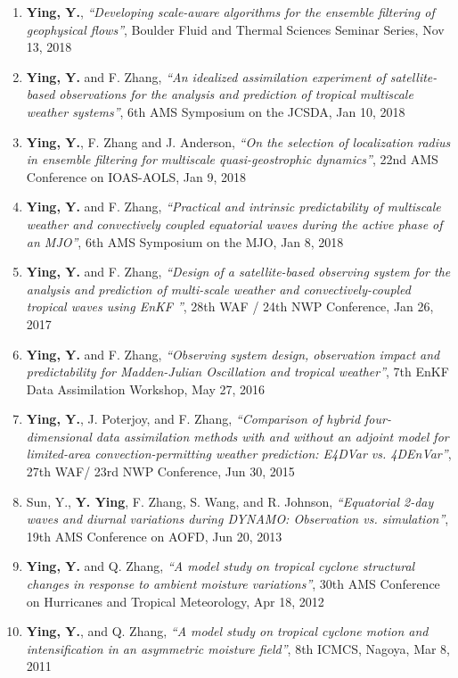 \begin{enumerate}
\item \textbf{Ying, Y.}, \textit{``Developing scale-aware algorithms for the ensemble filtering of geophysical flows''}, Boulder Fluid and Thermal Sciences Seminar Series, Nov 13, 2018

\item \textbf{Ying, Y.} and F. Zhang, \textit{``An idealized assimilation experiment of satellite-based observations for the analysis and prediction of tropical multiscale weather systems''}, 6th AMS Symposium on the JCSDA, Jan 10, 2018

\item \textbf{Ying, Y.}, F. Zhang and J. Anderson, \textit{``On the selection of localization radius in ensemble filtering for multiscale quasi-geostrophic dynamics''}, 22nd AMS Conference on IOAS-AOLS, Jan 9, 2018

\item \textbf{Ying, Y.} and F. Zhang, \textit{``Practical and intrinsic predictability of multiscale weather and convectively coupled equatorial waves during the active phase of an MJO''}, 6th AMS Symposium on the MJO, Jan 8, 2018

\item \textbf{Ying, Y.} and F. Zhang, \textit{``Design of a satellite-based observing system for the analysis and prediction of multi-scale weather and convectively-coupled tropical waves using EnKF ''}, 28th WAF / 24th NWP Conference, Jan 26, 2017

\item \textbf{Ying, Y.} and F. Zhang, \textit{``Observing system design, observation impact and predictability for Madden-Julian Oscillation and tropical weather''}, 7th EnKF Data Assimilation Workshop, May 27, 2016

\item \textbf{Ying, Y.}, J. Poterjoy, and F. Zhang, \textit{``Comparison of hybrid four-dimensional data assimilation methods with and without an adjoint model for limited-area convection-permitting weather prediction: E4DVar vs. 4DEnVar''}, 27th WAF/ 23rd NWP Conference, Jun 30, 2015

\item Sun, Y., \textbf{Y. Ying}, F. Zhang, S. Wang, and R. Johnson, \textit{``Equatorial 2-day waves and diurnal variations during DYNAMO: Observation vs. simulation''}, 19th AMS Conference on AOFD, Jun 20, 2013

\item \textbf{Ying, Y.} and Q. Zhang, \textit{``A model study on tropical cyclone structural changes in response to ambient moisture variations''}, 30th AMS Conference on Hurricanes and Tropical Meteorology, Apr 18, 2012

\item \textbf{Ying, Y.}, and Q. Zhang, \textit{``A model study on tropical cyclone motion and intensification in an asymmetric moisture field''}, 8th ICMCS, Nagoya, Mar 8, 2011

\end{enumerate}
